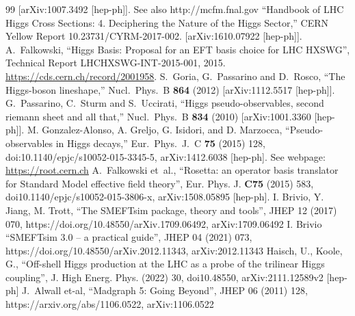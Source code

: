 \documentclass[aps,superscriptaddress,nofootinbib]{revtex4}
\begin{document}
\begin{thebibliography}{99}
  [arXiv:1007.3492 [hep-ph]].
  See also http://mcfm.fnal.gov
``Handbook of LHC Higgs Cross Sections: 4. Deciphering the Nature of the Higgs Sector,''
CERN Yellow Report 10.23731/CYRM-2017-002.
[arXiv:1610.07922 [hep-ph]].
{A.~Falkowski, ``{Higgs Basis: Proposal for an EFT basis choice
  for LHC HXSWG}'',} Technical Report LHCHXSWG-INT-2015-001, 2015.
\newblock \url{https://cds.cern.ch/record/2001958}.
  S.~Goria, G.~Passarino and D.~Rosco,
  ``The Higgs-boson lineshape,''
  Nucl.\ Phys.\ B  {\bf 864} (2012)
  [arXiv:1112.5517 [hep-ph]].
  G.~Passarino, C.~Sturm and S.~Uccirati,
  ``Higgs pseudo-observables, second riemann sheet and all that,''
  Nucl.\ Phys.\ B {\bf 834} (2010)
  [arXiv:1001.3360 [hep-ph]].
  M. Gonzalez-Alonso, A. Greljo, G. Isidori, and D. Marzocca, ``Pseudo-observables in
  Higgs decays,'' Eur.\ Phys.\ J.\ C {\bf 75} (2015) 128,
  doi:10.1140/epjc/s10052-015-3345-5, arXiv:1412.6038 [hep-ph].
See webpage: \url{https://root.cern.ch}
A.~Falkowski {et~al.}, ``{Rosetta: an operator basis translator for Standard Model effective field theory}'',
 { Eur. Phys. J.}  {\bf C75} (2015) 583,
 doi{10.1140/epjc/s10052-015-3806-x}, arXiv:1508.05895 [hep-ph].
I. Brivio, Y. Jiang, M. Trott, ``{The SMEFTsim package, theory and tools}'', JHEP 12 (2017) 070, https://doi.org/10.48550/arXiv.1709.06492, arXiv:1709.06492
I. Brivio ``{SMEFTsim 3.0 -- a practical guide}'', JHEP 04 (2021) 073, https://doi.org/10.48550/arXiv.2012.11343, arXiv:2012.11343
Haisch, U., Koole, G., ``{Off-shell Higgs production at the LHC as a probe of the trilinear Higgs coupling}'',
{ J. High Energ. Phys. } (2022) 30,
doi{10.48550}, arXiv:2111.12589v2 [hep-ph]
J.~Alwall {et-al}, ``{Madgraph 5: Going Beyond}'',
JHEP 06 (2011) 128, https://arxiv.org/abs/1106.0522, arXiv:1106.0522
\end{thebibliography}
\end{document}

